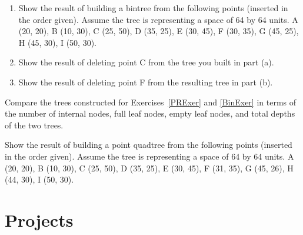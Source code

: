 \begin{exercises}
\item
\label{BinExer}
\begin{enumerate}
\item
Show the result of building a bintree from the following points
(inserted in the order given).
Assume the tree is representing a space of 64 by 64 units.
A (20, 20), B (10, 30), C (25, 50), D (35, 25), E (30, 45),
F (30, 35), G (45, 25), H (45, 30), I (50, 30).
\item
Show the result of deleting point C from the tree you built in part
(a).
\item
Show the result of deleting point F from the resulting tree in part
(b).
\end{enumerate}

\item
Compare the trees constructed for Exercises~\ref{PRExer} and
\ref{BinExer} in terms of the number of internal nodes, full leaf
nodes, empty leaf nodes, and total depths of the two trees.

\item
Show the result of building a point quadtree from the following points
(inserted in the order given).
Assume the tree is representing a space of 64 by 64 units.
A (20, 20), B (10, 30), C (25, 50), D (35, 25), E (30, 45),
F (31, 35), G (45, 26), H (44, 30), I (50, 30).

\end{exercises}

\section{Projects}

